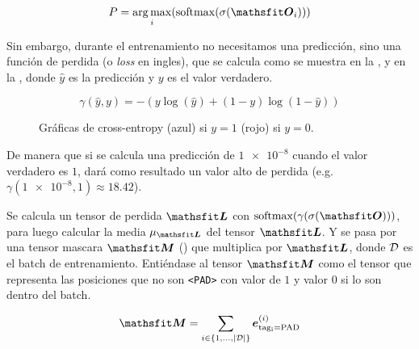 \begin{equation} \label{eq:bilstm-pred}
  P = \argmax_i (\softmax(\sigmoid(\tO_i)))
\end{equation}

Sin embargo, durante el entrenamiento no necesitamos una predicción, sino una función de perdida (o \emph{loss} en ingles), que se calcula como se muestra en la , y en la , donde $\hat{y}$ es la predicción y $y$ es el valor verdadero.

\begin{equation} \label{eq:cross-entropy-loss}
  \gamma(\hat{y}, y) = -{(y\log(\hat{y}) + (1 - y)\log(1 - \hat{y}))}
\end{equation}

\begin{figure}[H]
  \centering
\decoRule
\caption{Gráficas de cross-entropy (azul) si $y = 1$ (rojo) si $y = 0$.}
\label{fig:cross-entropy-y1}
\end{figure}

De manera que si se calcula una predicción de $\num{1e-8}$ cuando el valor verdadero es $1$, dará como resultado un valor alto de perdida (e.g. $\gamma(\num{1e-8}, 1) \approx \num{18.42}$).

Se calcula un tensor de perdida $\tL$ con $\softmax(\gamma(\sigmoid(\tO)))$, para luego calcular la media $\mu_{\tL}$ del tensor $\tL$. Y se pasa por una tensor mascara $\tM$ () que multiplica por $\tL$, donde $\mathcal{D}$ es el batch de entrenamiento. Entiéndase al tensor $\tM$ como el tensor que representa las posiciones que no son \texttt{<PAD>} con valor de $1$ y valor $0$ si lo son dentro del batch.

\begin{equation} \label{eq:bilstm-mask-tensor}
  \tM = \sum_{i \in \{1, \ldots, |\train|\}} \ve_{\mathrm{tag_i = \mathrm{PAD}}}^{(i)}
\end{equation}

